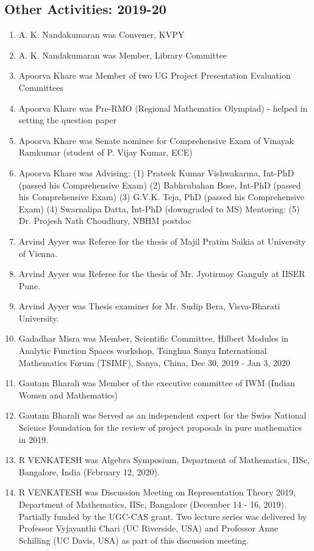 \subsection{Other Activities: 2019-20}
\begin{enumerate}
\item A. K. Nandakumaran was Convener, KVPY
\item A. K. Nandakumaran was Member, Library Committee
\item Apoorva Khare was Member of two UG Project Presentation Evaluation Committees
\item Apoorva Khare was Pre-RMO (Regional Mathematics Olympiad) - helped in setting the question paper
\item Apoorva Khare was Senate nominee for Comprehensive Exam of Vinayak Ramkumar (student of P. Vijay Kumar, ECE)
\item Apoorva Khare was Advising: (1) Prateek Kumar Vishwakarma, Int-PhD (passed his Comprehensive Exam) (2) Babhrubahan Bose, Int-PhD (passed his Comprehensive Exam) (3) G.V.K. Teja, PhD (passed his Comprehensive Exam) (4) Swarnalipa Datta, Int-PhD (downgraded to MS) Mentoring: (5) Dr. Projesh Nath Choudhury, NBHM postdoc
\item Arvind Ayyer was Referee for the thesis of Majil Pratim Saikia at University of Vienna.
\item Arvind Ayyer was Referee for the thesis of Mr. Jyotirmoy Ganguly at IISER Pune.
\item Arvind Ayyer was Thesis examiner for Mr. Sudip Bera, Visva-Bharati University.
\item Gadadhar Misra was Member, Scientific Committee, Hilbert Modules in Analytic Function Spaces workshop,     Tsinghua Sanya International Mathematics Forum (TSIMF), Sanya, China, Dec 30, 2019 - Jan 3, 2020
\item Gautam Bharali was Member of the executive committee of IWM (Indian Women and Mathematics)
\item Gautam Bharali was Served as an independent expert for the Swiss National Science Foundation for the review of project proposals in pure mathematics in 2019.
\item R VENKATESH was Algebra Symposium, Department of Mathematics, IISc, Bangalore, India (February 12, 2020).
\item R VENKATESH was Discussion Meeting on Representation Theory 2019, Department of Mathematics, IISc, Bangalore (December 14 - 16, 2019). Partially funded by the UGC-CAS grant.  Two lecture series was delivered by Professor Vyjayanthi Chari (UC Riverside, USA) and Professor Anne Schilling (UC Davis, USA) as part of this discussion meeting.

\end{enumerate}
